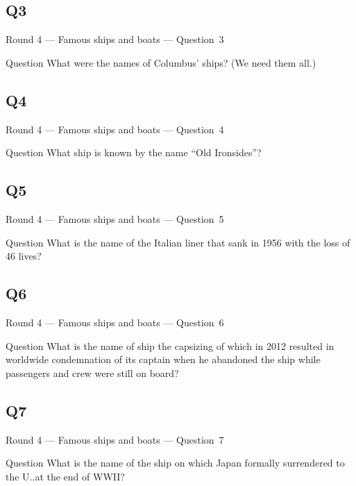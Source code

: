 \documentclass[11pt]{beamer}
\begin{document}
\subsection*{Q3}
\begin{frame}[t]{Round 4 --- Famous ships and boats --- \mbox{Question 3}}
    \vspace{-0.5em}
    \begin{block}{Question}
        What were the names of Columbus' ships? (We need them all.)
    \end{block}
\end{frame}
\subsection*{Q4}
\begin{frame}[t]{Round 4 --- Famous ships and boats --- \mbox{Question 4}}
    \vspace{-0.5em}
    \begin{block}{Question}
        What ship is known by the name ``Old Ironsides''?
    \end{block}
\end{frame}
\subsection*{Q5}
\begin{frame}[t]{Round 4 --- Famous ships and boats --- \mbox{Question 5}}
    \vspace{-0.5em}
    \begin{block}{Question}
        What is the name of the Italian liner that sank in 1956 with the loss of 46 lives?
    \end{block}
\end{frame}
\subsection*{Q6}
\begin{frame}[t]{Round 4 --- Famous ships and boats --- \mbox{Question 6}}
    \vspace{-0.5em}
    \begin{block}{Question}
        What is the name of ship the capsizing of which in  2012 resulted in worldwide condemnation of its captain when he abandoned the ship while passengers and crew were still on board?
    \end{block}
\end{frame}
\subsection*{Q7}
\begin{frame}[t]{Round 4 --- Famous ships and boats --- \mbox{Question 7}}
    \vspace{-0.5em}
    \begin{block}{Question}
        What is the name of the ship on which Japan formally surrendered to the U.\@S.\@ at the end of WWII\@?
    \end{block}
\end{frame}
\end{document}
